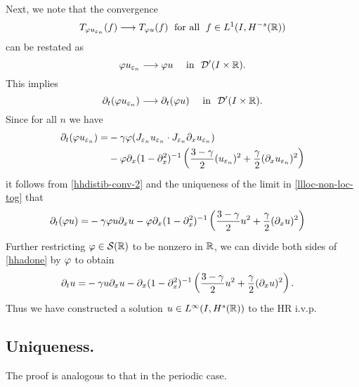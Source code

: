 		Next, we note that the convergence  
		\begin{equation}
			\label{hhweak-conv-2}
			T_{\varphi u_{\varepsilon_n}}(f)  \longrightarrow  T_{\varphi u} (f) \;
			\text{ for all } \;  f \in L^1(I, H^{-s}(\mathbb{R}))
		\end{equation}
		can be restated as 
		\begin{equation}
			\varphi u_{\varepsilon_n}  \longrightarrow  \varphi u
			\quad
			\text{ in }  \,\,
			\mathcal{D}'(I\times \mathbb{R}).
		\end{equation}
		This implies 
		\begin{equation}
			\label{hhdistib-conv-2}
			\partial_t(\varphi u_{\varepsilon_n})  \longrightarrow  \partial_t (\varphi u)
			\quad
			\text{ in }  \,\, \mathcal{D}'(I\times \mathbb{R}).
		\end{equation}
		Since for all $n$ we have 
		\begin{equation}
			\begin{split}
			 \partial_t (\varphi u_{\varepsilon_n})
			 = & -\gamma \varphi
			(J_{\varepsilon_n} u_{\varepsilon_n}  \cdot
			J_{\varepsilon_n}\partial_x u_{\varepsilon_n})
			\\
			& -
			\varphi \partial_x(1- \partial_x^2)^{-1} \left( \frac{3-\gamma}{2} (u_{\varepsilon_n})^2
			 + \frac{\gamma}{2} (\partial_x u_{\varepsilon_n})^2 \right )
		 \end{split}
		\end{equation}
		it follows from \eqref{hhdistib-conv-2} and the uniqueness of the
		limit in \eqref{llloc-non-loc-tog} that
		\begin{equation}
			\begin{split}
			 \partial_t (\varphi u)
			 = & -\gamma \varphi
			u \partial_x u - \varphi \partial_x(1- \partial_x^2)^{-1} \left( \frac{3-\gamma}{2} u^2
			 + \frac{\gamma}{2} (\partial_x u)^2 \right )
			\label{hhadone}
			\end{split}
		\end{equation}
		Further restricting $\varphi \in \mathcal{S}(\mathbb{R})$ to be nonzero in
		$\mathbb{R}$, we
		can divide both sides of \eqref{hhadone} by $\varphi$ to obtain
		\begin{equation}
			\label{hh2yy}
			\begin{split}
			 \partial_t  u
			 = & -\gamma
			u \partial_x u - \partial_x(1- \partial_x^2)^{-1} \left( \frac{3-\gamma}{2} u^2
			 + \frac{\gamma}{2} (\partial_x u)^2 \right ).
			\end{split}
		\end{equation}
		Thus we have constructed a solution $u \in L^\infty(I, H^s(\mathbb{R}))$
		to the HR i.v.p. 
\subsection{Uniqueness.} The proof is analogous to that in the periodic case.
